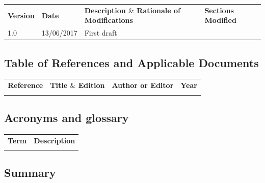 \documentclass[12pt]{article}
\begin{document}
\begin{table}[H]
\large
\centering
\begin{adjustbox}{width=\textwidth}
\begin{tabular}{ |p{1.5cm}|p{2.5cm}|p{9.0cm}|p{3.0cm}| }
\hhline{----}
\textbf{Version} & \textbf{Date} & \textbf{Description  $  \&  $  Rationale of
Modifications} & \textbf{Sections Modified} \\
\hhline{----}
1.0 & 13/06/2017 & First draft &  \\ 
\hline
\end{tabular}
\end{adjustbox}
\end{table}

\subsection{Table of References and Applicable Documents}

\begin{table}[H]
\large
\centering
\begin{adjustbox}{width=\textwidth}
\begin{tabular}{ |p{2.66in}|p{2.66in}|p{0.95in}|p{0.43in}| }
\hhline{----}
\textbf{Reference} & \textbf{Title  $  \&  $  Edition} & \textbf{Author or
Editor} & \textbf{Year}
\\
\hhline{----}
 &  &  &  \\ 
\hline
\end{tabular}
\end{adjustbox}
\end{table}

\subsection{Acronyms and glossary}

\begin{table}[H]
\large
\centering
\begin{adjustbox}{width=\textwidth}
\begin{tabular}{ |p{1.24in}|p{5.45in}| }
\hhline{--}
\textbf{Term} & \textbf{Description} \\ 
\hhline{--}
 &  \\ 
\hline
\end{tabular}
\end{adjustbox}
\end{table}

\subsection{Summary}
\end{document}
